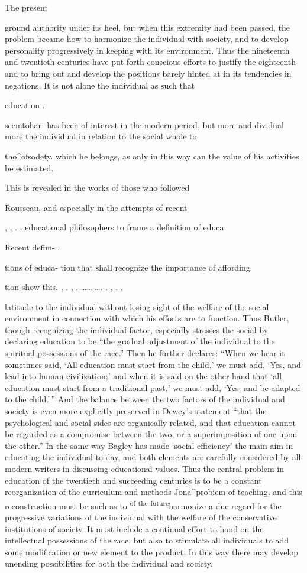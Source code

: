 \documentclass[]{book}
\begin{document}
The present

ground authority under its heel, but when this extremity had been passed, the problem became how to harmonize the individual with society, and to develop personality progressively in keeping with its environment. Thus the nineteenth and twentieth centuries have put forth conscious efforts to justify the eighteenth and to bring out and develop the positions barely hinted at in its tendencies in negations. It is not alone the individual as such that

education .

seemtohar- has been of interest in the modern period, but more and dividual more the individual in relation to the social whole to

tho\^{}ofsodety. which he belongs, as only in this way can the value of his activities be estimated.

This is revealed in the works of those who followed

Rousseau, and especially in the attempts of recent

, , . . educational philosophers to frame a definition of educa

Recent defim- .

tions of educa- tion that shall recognize the importance of affording

tion show this. , . , , \ldots{}\ldots{} \ldots{}. . , , ,

latitude to the individual without losing sight of the welfare of the social environment in connection with which his efforts are to function. Thus Butler, though recognizing the individual factor, especially stresses the social by declaring education to be ``the gradual adjustment of the individual to the spiritual possessions of the race.'' Then he further declares: ``When we hear it sometimes said, `All education must start from the child,' we must add, `Yes, and lead into human civilization;' and when it is said on the other hand that `all education must start from a traditional past,' we must add, `Yes, and be adapted to the child.'\,'' And the balance between the two factors of the individual and society is even more explicitly preserved in Dewey's statement ``that the psychological and social sides are organically related, and that education cannot be regarded as a compromise between the two, or a superimposition of one upon the other.'' In the same way Bagley has made `social efficiency' the main aim in educating the individual to-day, and both elements are carefully considered by all modern writers in discussing educational values. Thus the central problem in education of the twentieth and succeeding centuries is to be a constant reorganization of the curriculum and methods Jona\^{}probiem of teaching, and this reconstruction must be such as to \textsuperscript{of} \textsuperscript{the} \textsuperscript{future}harmonize a due regard for the progressive variations of the individual with the welfare of the conservative institutions of society. It must include a continual effort to hand on the intellectual possessions of the race, but also to stimulate all individuals to add some modification or new element to the product. In this way there may develop unending possibilities for both the individual and society.
\end{document}
